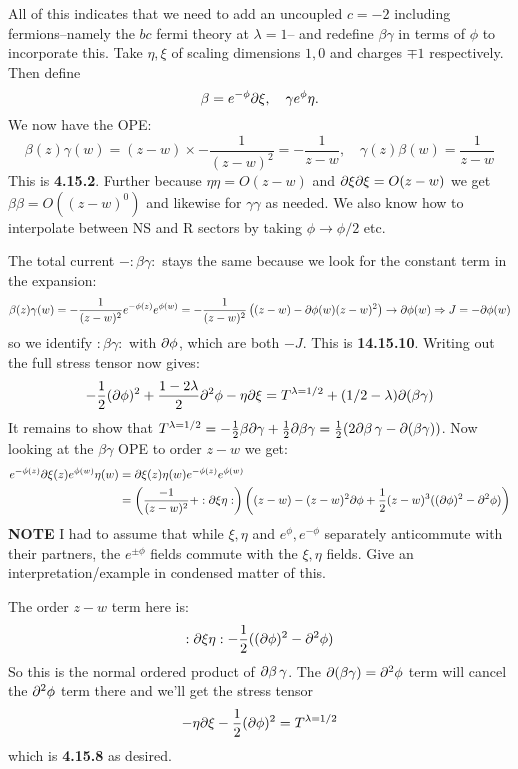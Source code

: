 \documentclass[11pt]{article}
\begin{document}
\begin{enumerate}
	All of this indicates that we need to add an uncoupled $c = -2$ including fermions--namely the $bc$ fermi theory at $\lambda = 1$--  and redefine $\beta \gamma$ in terms of $\phi$ to incorporate this. Take $\eta, \xi$ of scaling dimensions $1, 0$ and charges $\mp 1$ respectively. Then define
	\[
		\beta = e^{- \phi} \partial \xi, \quad \gamma e^{\phi} \eta.
	\]
	We now have the OPE:
	\[
		\beta(z) \gamma(w) = (z-w) \times - \frac{1}{(z-w)^2} = -\frac{1}{z-w}, \quad \gamma(z) \beta(w) = \frac{1}{z-w}
	\]
	This is \textbf{4.15.2}. Further because $\eta \eta = O(z-w)$ and  $\partial \xi \partial \xi = O(z - w)$ we get $\beta \beta = O((z-w)^0)$ and likewise for $\gamma \gamma$ as needed. We also know how to interpolate between NS and R sectors by taking $\phi \to \phi/2$ etc. 
	
	The total current $-:\beta \gamma:$ stays the same because we look for the constant term in the expansion:
	\[
		\beta(z) \gamma(w) = -\frac{1}{(z-w)^2} e^{-\phi(z)} e^{\phi(w)} = -\frac{1}{(z-w)^2} \left((z-w) - \partial \phi(w) (z-w)^2 \right) \to \partial \phi(w) \Rightarrow J = - \partial \phi(w)
	\]
	so we identify $:\beta \gamma:$ with $\partial \phi$, which are both $-J$. This is \textbf{14.15.10}. Writing out the full stress tensor now gives:
	\[
		-\frac12 (\partial \phi)^2 + \frac{1 - 2\lambda}{2} \partial^2 \phi - \eta \partial \xi = T^{\lambda = 1/2} + (1/2 - \lambda) \partial(\beta \gamma)
	\]
	It remains to show that $T^{\lambda = 1/2} = -\frac12 \beta \partial \gamma + \frac12 \partial \beta \gamma = \frac12 (2 \partial \beta \, \gamma - \partial (\beta \gamma))$. Now looking at the $\beta \gamma$ OPE to order $z-w$ we get:
	\[
	\begin{aligned}
		e^{- \phi(z)} \partial \xi(z) e^{\phi(w)} \eta(w) &= \partial \xi(z) \eta(w) e^{- \phi(z)} e^{\phi(w)} \\ &=  \left(\frac{-1}{(z-w)^2} + :\partial \xi \eta: \right) \left( (z-w) -  (z-w)^2 \partial \phi + \frac12 (z-w)^3 ((\partial \phi)^2 - \partial^2 \phi) \right)
	\end{aligned}
	\]
	\textbf{NOTE} I had to assume that while $\xi, \eta$ and $e^{\phi}, e^{-\phi}$ separately anticommute with their partners, the $e^{\pm \phi}$ fields commute with the $\xi, \eta$ fields. Give an interpretation/example in condensed matter of this. 
	
	The order $z-w$ term here is:
	\[
		:\partial \xi \eta: - \frac12 ((\partial \phi)^2 - \partial^2 \phi)
	\]
	So this is the normal ordered product of $\partial \beta\, \gamma$. The $\partial (\beta \gamma) = \partial^2 \phi$ term will cancel the $\partial^2 \phi$ term there and we'll get the stress tensor 
	\[
		- \eta \partial \xi  - \frac12 (\partial \phi)^2 = T^{\lambda = 1/2}
	\]
	which is \textbf{4.15.8} as desired.
	

\end{enumerate}
\end{document}
